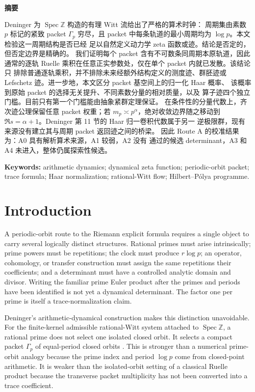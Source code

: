 \documentclass[11pt]{article}
\theoremstyle{definition}
\theoremstyle{remark}
\newcommand{\Z}{\mathbb{Z}}
\newcommand{\Spec}{\operatorname{Spec}}
\begin{document}
\ifPDFTeX\else
\begin{center}
{\zhfont\bfseries 摘要}
\end{center}
{\zhfont
Deninger 为 \(\Spec\Z\) 构造的有理 Witt 流给出了严格的算术时钟：
周期集由素数 \(p\) 标记的紧致 packet \(\Gamma_p\) 穷尽，且 packet
中每条轨道的最小周期均为 \(\log p\)。本文检验这一周期结构是否已经
足以自然定义动力学 zeta 函数或迹。结论是否定的，但否定边界是精确的。
我们证明每个 packet 含有不可数条同周期本原轨道，因此通常的逐轨
Ruelle 乘积在任意正实参数处，仅在单个 packet 内就已发散。该结论只
排除普通逐轨乘积，并不排除未来经额外结构定义的测度迹、群胚迹或
Lefschetz 迹。进一步地，本文区分 packet 基空间上的归一化 Haar 概率、
该概率到原始 packet 的选择无关提升、不同素数分量的相对质量，以及
算子迹四个独立门槛。目前只有第一个门槛能由抽象紧群定理保证。
在条件性的分量代数上，齐次迹公理保留任意 packet 权重；若
\(m_p\asymp p^\alpha\)，绝对收敛边界随之移动到
\(\Re s=\alpha+1\)。Deninger 第 11 节的 Haar 归一卷积代数属于另一
逆极限群，现有来源没有建立其与周期 packet 返回迹之间的桥梁。
因此 Route A 的校准结果为：A0 具有解析算术来源，A1 较弱，A2 没有
通过的候选 determinant，A3 和 A4 未进入，整体仍属探索性候选。
}
\fi

\medskip
\noindent\textbf{Keywords:} arithmetic dynamics; dynamical zeta function;
periodic-orbit packet; trace formula; Haar normalization; rational-Witt flow;
Hilbert--P\'olya programme.

\section{Introduction}

A periodic-orbit route to the Riemann explicit formula requires a single
object to carry several logically distinct structures.  Rational primes must
arise intrinsically; prime powers must be repetitions; the clock must produce
\(r\log p\); an operator, cohomology, or transfer construction must assign the
same repetitions their coefficients; and a determinant must have a controlled
analytic domain and divisor.  Writing the familiar prime Euler product after
the primes and periods have been identified is not yet a dynamical
determinant.  The factor one per prime is itself a trace-normalization claim.

Deninger's arithmetic-dynamical construction makes this distinction
unavoidable.  For the finite-kernel admissible rational-Witt system attached
to \(\Spec\Z\), a rational prime does not select one isolated closed orbit.
It selects a compact packet \(\Gamma_p\) of equal-period closed orbits
\citep{Deninger2026,Deninger2024}.  This is stronger than a numerical
prime-orbit analogy because the prime index and period \(\log p\) come from
closed-point arithmetic.  It is weaker than the isolated-orbit setting of a
classical Ruelle product because the transverse packet multiplicity has not
been converted into a trace coefficient.
\end{document}

